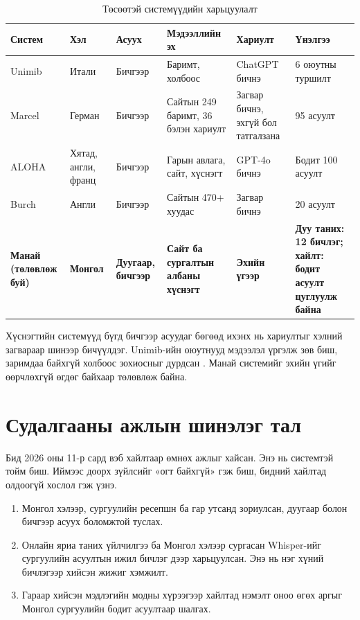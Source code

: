 \begin{table}[H]
\centering
\caption{Төсөөтэй системүүдийн харьцуулалт}
\label{tab:similar_systems}
\small
\begin{tabular}{|p{2.2cm}|p{1.9cm}|p{1.6cm}|p{3.0cm}|p{2.4cm}|p{2.4cm}|}
\hline
\textbf{Систем} & \textbf{Хэл} & \textbf{Асуух} & \textbf{Мэдээллийн эх} & \textbf{Хариулт} & \textbf{Үнэлгээ} \\
\hline
Unimib \cite{antico2024unimib} & Итали & Бичгээр & Баримт, холбоос & ChatGPT бичнэ & 6 оюутны туршилт \\
\hline
Marcel \cite{trienes2025marcel} & Герман & Бичгээр & Сайтын 249 баримт, 36 бэлэн хариулт & Загвар бичнэ, эхгүй бол татгалзана & 95 асуулт \\
\hline
ALOHA \cite{tao2025aloha} & Хятад, англи, франц & Бичгээр & Гарын авлага, сайт, хүснэгт & GPT-4o бичнэ & Бодит 100 асуулт \\
\hline
Burch \cite{matic2026burch} & Англи & Бичгээр & Сайтын 470+ хуудас & Загвар бичнэ & 20 асуулт \\
\hline
\textbf{Манай (төлөвлөж буй)} & \textbf{Монгол} & \textbf{Дуугаар, бичгээр} & \textbf{Сайт ба сургалтын албаны хүснэгт} & \textbf{Эхийн үгээр} & \textbf{Дуу таних: 12 бичлэг; хайлт: бодит асуулт цуглуулж байна} \\
\hline
\end{tabular}
\end{table}

Хүснэгтийн системүүд бүгд бичгээр асуудаг бөгөөд ихэнх нь хариултыг хэлний загвараар шинээр бичүүлдэг. Unimib-ийн оюутнууд мэдээлэл үргэлж зөв биш, заримдаа байхгүй холбоос зохиосныг дурдсан \cite{antico2024unimib}. Манай системийг эхийн үгийг өөрчлөхгүй өгдөг байхаар төлөвлөж байна.

\section{Судалгааны ажлын шинэлэг тал}
\label{sec:lit-novelty}

Бид 2026 оны 11-р сард вэб хайлтаар өмнөх ажлыг хайсан. Энэ нь системтэй тойм биш. Иймээс доорх зүйлсийг «огт байхгүй» гэж биш, бидний хайлтад олдоогүй хослол гэж үзнэ.
\begin{enumerate}
    \item Монгол хэлээр, сургуулийн ресепшн ба гар утсанд зориулсан, дуугаар болон бичгээр асуух боломжтой туслах.
    \item Онлайн яриа таних үйлчилгээ ба Монгол хэлээр сургасан Whisper-ийг сургуулийн асуултын ижил бичлэг дээр харьцуулсан. Энэ нь нэг хүний бичлэгээр хийсэн жижиг хэмжилт.
    \item Гараар хийсэн мэдлэгийн модны хүрээгээр хайлтад нэмэлт оноо өгөх аргыг Монгол сургуулийн бодит асуултаар шалгах.
\end{enumerate}
\fi
\fi
